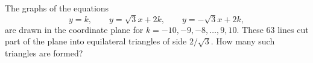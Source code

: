The graphs of the equations \[ y=k, \qquad y=\sqrt{3}x+2k, \qquad y=-\sqrt{3}x+2k, \] are drawn in the coordinate plane for $k=-10,-9,-8,\ldots,9,10.$  These 63 lines cut part of the plane into equilateral triangles of side $2/\sqrt{3}.$  How many such triangles are formed?